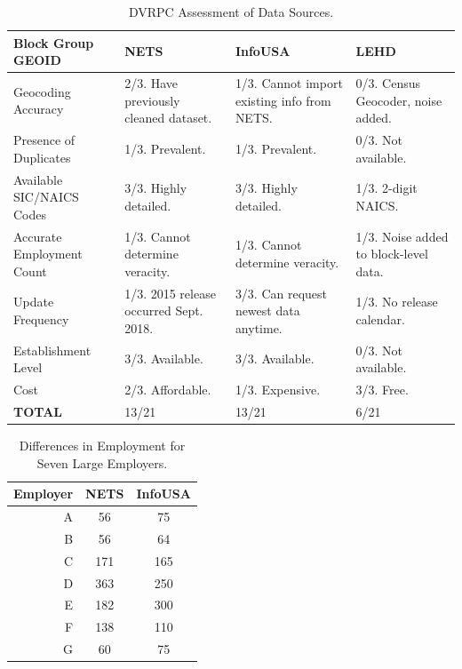 \documentclass[paper = letter, fontsize = 11pt]{scrartcl}
\begin{document}
\clearpage
\begin{table}[h]
	\begin{center}
		\begin{tabular}{ p{1.5in} | p{1.25in} p{1.25in} p{1.25in} }
			Block Group GEOID & NETS & InfoUSA & LEHD \\
			\hline
			\hline
			Geocoding Accuracy & 2/3. Have previously cleaned dataset. & 1/3. Cannot import existing info from NETS. & 0/3. Census Geocoder, noise added.\\
			\hline 
			Presence of Duplicates & 1/3. Prevalent. & 1/3. Prevalent. & 0/3. Not available.\\
			\hline 
			Available SIC/NAICS Codes & 3/3. Highly detailed. & 3/3. Highly detailed. & 1/3. 2-digit NAICS.\\
			\hline
			Accurate Employment Count & 1/3. Cannot determine veracity. & 1/3. Cannot determine veracity. & 1/3. Noise added to block-level data.\\
			\hline
			Update Frequency & 1/3. 2015 release occurred Sept. 2018. & 3/3. Can request newest data anytime. & 1/3. No release calendar. \\
			\hline
			Establishment Level & 3/3. Available. & 3/3. Available. & 0/3. Not available.\\
			\hline
			Cost & 2/3. Affordable. & 1/3. Expensive. & 3/3. Free. \\
			\hline
			\hline
			\textbf{TOTAL} & 13/21 & 13/21 & 6/21 \\
			\hline
		\end{tabular}
	\end{center}
	\caption{DVRPC Assessment of Data Sources.}
\end{table}
\begin{table}[h]
	\begin{center}
		\begin{tabular}{ r | c c }
			Employer & NETS & InfoUSA \\
			\hline
			\hline
			A & 56 & 75 \\
			\hline 
			B & 56 & 64 \\
			\hline 
			C & 171 & 165 \\
			\hline
			D & 363 & 250 \\
			\hline 
			E & 182 & 300 \\
			\hline 
			F & 138 & 110 \\
			\hline 
			G & 60 & 75 \\
			\hline
		\end{tabular}
	\end{center}
	\caption{Differences in Employment for Seven Large Employers.}
\end{table}
\end{document}
